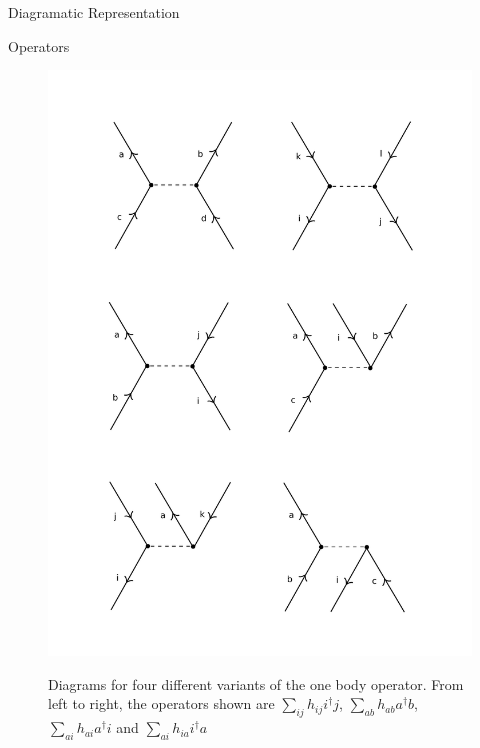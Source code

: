 \documentclass[twoside,english]{uiofysmaster}
\begin{document}
\begin{chapter}{Diagramatic Representation}
\begin{section}{Operators}
		\begin{figure}[H]
			\includegraphics[width=\textwidth]{Figures/TwoBodyOperator.pdf}
			\label{TwoBodyOperator}
			\caption{Diagrams for four different variants of the one body operator. From left to right, the operators shown are $\sum_{ij} h_{ij} i^\dagger j $, $\sum_{ab} h_{ab} a^\dagger b$, $\sum_{ai}h_{ai} a^\dagger i$ and $\sum_{ai} h_{ia} i^\dagger a$}
		\end{figure}


\end{section}
\end{chapter}
\end{document}
